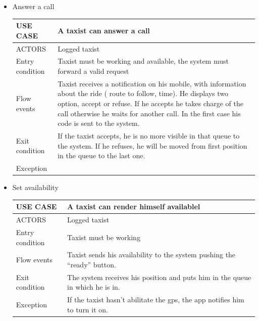 \begin{itemize}
\newpage

\item Answer a call
	\begin{center}
   	 \begin{tabular}{ | l | p{11cm} |}
   	 \hline
   	USE CASE & A taxist can answer a call\\ \hline
   	 ACTORS & Logged taxist \\ \hline
    	 Entry condition & Taxist must be working and available, the system must forward a valid request \\ \hline
    	 Flow events & Taxist receives a notification on his mobile, with information about the ride ( route to follow, time).
He displays two option, accept or refuse. If he accepts he takes charge of the call otherwise he waits for another call. In the first case his code is sent to the system.\\ \hline
  	   Exit condition & If the taxist accepts, he is no more visible in that queue to the system.
If he refuses, he will be moved from first position in the queue to the last one.\\ \hline
  	   Exception &  \\ \hline
    \end{tabular}
\end{center}
\item Set availability
	\begin{center}
   	 \begin{tabular}{ | l | p{11cm} |}
   	 \hline
   	USE CASE & A taxist can render himself availablel\\ \hline
   	 ACTORS & Logged taxist \\ \hline
    	 Entry condition & Taxist must be working \\ \hline
    	 Flow events & Taxist sends his availability to the system pushing the “ready” button.\\ \hline
  	   Exit condition & The system receives his position and puts him in the queue in which he is in.\\ \hline
  	   Exception &  If the taxist hasn’t abilitate the gps, the app notifies him to turn it on.\\ \hline
    \end{tabular}
\end{center}


\end{itemize}
